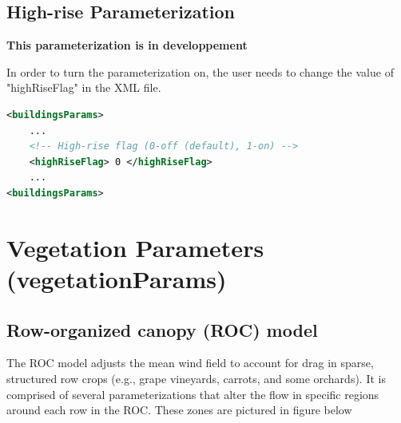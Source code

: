 \subsection{High-rise Parameterization}

\textbf{This parameterization is in developpement}

In order to turn the parameterization on, the user needs to change the value of "highRiseFlag" in the XML file.

\begin{lstlisting}[language=XML]
<buildingsParams>
	...
	<!-- High-rise flag (0-off (default), 1-on) -->
    <highRiseFlag> 0 </highRiseFlag> 
	... 				
<buildingsParams>
\end{lstlisting}

\section{Vegetation Parameters (vegetationParams)}

\subsection{Row-organized canopy (ROC) model}
The ROC model adjusts the mean wind field to account for drag in sparse, structured row crops (e.g., grape vineyards, carrots, and some orchards). It is comprised of several parameterizations that alter the flow in specific regions around each row in the ROC. These zones are pictured in figure below
